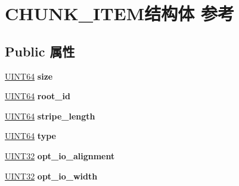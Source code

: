 \hypertarget{struct_c_h_u_n_k___i_t_e_m}{}\section{C\+H\+U\+N\+K\+\_\+\+I\+T\+E\+M结构体 参考}
\label{struct_c_h_u_n_k___i_t_e_m}
\subsection*{Public 属性}
\begin{DoxyCompactItemize}
\item 
\mbox{\label{struct_c_h_u_n_k___i_t_e_m_ae58cd793cefd45fa55de155b19045f0c}} 
\hyperlink{_processor_bind_8h_a57be03562867144161c1bfee95ca8f7c}{U\+I\+N\+T64} {\bfseries size}
\item 
\mbox{\label{struct_c_h_u_n_k___i_t_e_m_afcf0b5c7e0c577884dee026af47487db}} 
\hyperlink{_processor_bind_8h_a57be03562867144161c1bfee95ca8f7c}{U\+I\+N\+T64} {\bfseries root\+\_\+id}
\item 
\mbox{\label{struct_c_h_u_n_k___i_t_e_m_afb1d71488c9dfe3695329b921d9b9faa}} 
\hyperlink{_processor_bind_8h_a57be03562867144161c1bfee95ca8f7c}{U\+I\+N\+T64} {\bfseries stripe\+\_\+length}
\item 
\mbox{\label{struct_c_h_u_n_k___i_t_e_m_ae9873a64dfe1572170bfebd12ad97afb}} 
\hyperlink{_processor_bind_8h_a57be03562867144161c1bfee95ca8f7c}{U\+I\+N\+T64} {\bfseries type}
\item 
\mbox{\label{struct_c_h_u_n_k___i_t_e_m_aed6bbe9f2a752e7f60b55277d4e9382c}} 
\hyperlink{_processor_bind_8h_ae1e6edbbc26d6fbc71a90190d0266018}{U\+I\+N\+T32} {\bfseries opt\+\_\+io\+\_\+alignment}
\item 
\mbox{\label{struct_c_h_u_n_k___i_t_e_m_a078f7b047439c121b33b1ea7acd32fbf}} 
\hyperlink{_processor_bind_8h_ae1e6edbbc26d6fbc71a90190d0266018}{U\+I\+N\+T32} {\bfseries opt\+\_\+io\+\_\+width}
\item 
\mbox{\label{struct_c_h_u_n_k___i_t_e_m_a882b61eea5eb5c3f80ee0bbc142e0799}} 

\end{DoxyCompactItemize}

